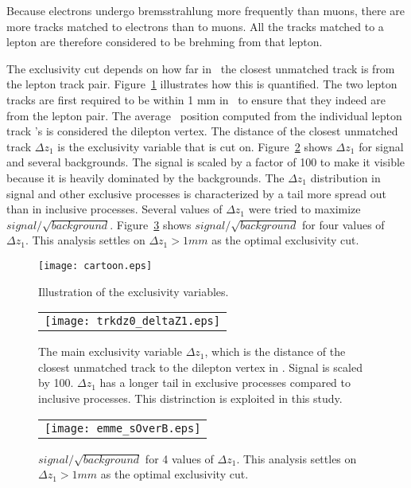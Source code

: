 \par Because electrons undergo bremsstrahlung more frequently than muons, there are more tracks 
matched to electrons than to muons. All the tracks matched to a lepton are therefore 
considered to be brehming from that lepton.

\par The exclusivity cut depends on how far in \ the closest unmatched track 
is from the lepton track pair. Figure~\ref{fig:cartoon} illustrates how this is quantified. 
The two lepton tracks are first required to be within 1 mm in \ to ensure that they indeed 
are from the lepton pair. The average \ position computed from the individual lepton track 's is 
considered the dilepton vertex. The distance of the closest unmatched track $\Delta z_1$ is the 
exclusivity variable that is cut on. Figure~\ref{fig:deltaZ1} shows $\Delta z_1$  for signal and several backgrounds.
The signal is scaled by a factor of 100 to make it visible because it is heavily dominated by the backgrounds.
The $\Delta z_1$ distribution in signal and other exclusive processes 
is characterized by a tail more spread out than in inclusive processes. Several values of $\Delta z_1$ 
were tried to maximize $signal/\sqrt{background}$. Figure~\ref{fig:sOverB} shows $signal/\sqrt{background}$
for four values of $\Delta z_1$. This analysis settles on $\Delta z_1 > 1 mm$ as the optimal 
exclusivity cut.    

\begin{figure}[t]
\centering
\texttt{[image: cartoon.eps]}
\caption{Illustration of the exclusivity variables.}
\label{fig:cartoon}
\end{figure}

\begin{figure}[!h]
\centering
\begin{tabular}{c}
	\texttt{[image: trkdz0\_deltaZ1.eps]}
\end{tabular}
\caption{The main exclusivity variable $\Delta z_1$, which is the distance of 
the closest unmatched track to the dilepton vertex in . Signal is scaled by 100. 
$\Delta z_1$ has a longer tail in exclusive processes compared to inclusive processes. 
This distrinction is exploited in this study.}
\label{fig:deltaZ1}
\end{figure}

\begin{figure}[!h]
\centering
\begin{tabular}{c}
\texttt{[image: emme\_sOverB.eps]}
\end{tabular}
\caption{$signal/\sqrt{background}$ for 4 values of $\Delta z_1$. This analysis settles 
on $\Delta z_1 > 1 mm$ as the optimal exclusivity cut.}
\label{fig:sOverB}
\end{figure}

